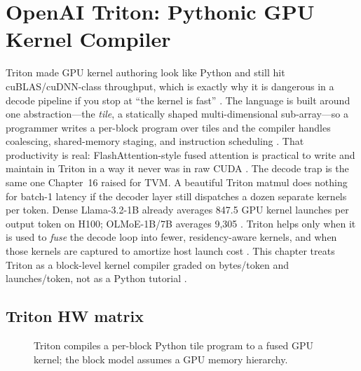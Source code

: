 \chapter{OpenAI Triton: Pythonic GPU Kernel Compiler}
\label{chap:ch17}

Triton made GPU kernel authoring look like Python and still hit cuBLAS/cuDNN-class throughput, which is exactly why it is dangerous in a decode pipeline if you stop at ``the kernel is fast'' \citep{tillet2019triton}. The language is built around one abstraction---the \emph{tile}, a statically shaped multi-dimensional sub-array---so a programmer writes a per-block program over tiles and the compiler handles coalescing, shared-memory staging, and instruction scheduling \citep{tillet2019triton}. That productivity is real: FlashAttention-style fused attention is practical to write and maintain in Triton in a way it never was in raw CUDA \citep{dao2022flashattention}.
The decode trap is the same one Chapter~16 raised for TVM. A beautiful Triton matmul does nothing for batch-1 latency if the decoder layer still dispatches a dozen separate kernels per token. Dense Llama-3.2-1B already averages 847.5 GPU kernel launches per output token on H100; OLMoE-1B/7B averages 9{,}305 \citep{taxbreak2026}. Triton helps only when it is used to \emph{fuse} the decode loop into fewer, residency-aware kernels, and when those kernels are captured to amortize host launch cost \citep{memoryfloor2026,nvidia2024cudagraphs}. This chapter treats Triton as a block-level kernel compiler graded on bytes/token and launches/token, not as a Python tutorial \citep{patel2025llminference}.

\section{Triton HW matrix}
\label{sec:ch17_triton_hw_matrix}


\begin{figure}[t]
\centering
{}
\caption{Triton compiles a per-block Python tile program to a fused GPU kernel; the block model assumes a GPU memory hierarchy.}
\label{fig:triton_hw_matrix_pipeline}
\end{figure}

